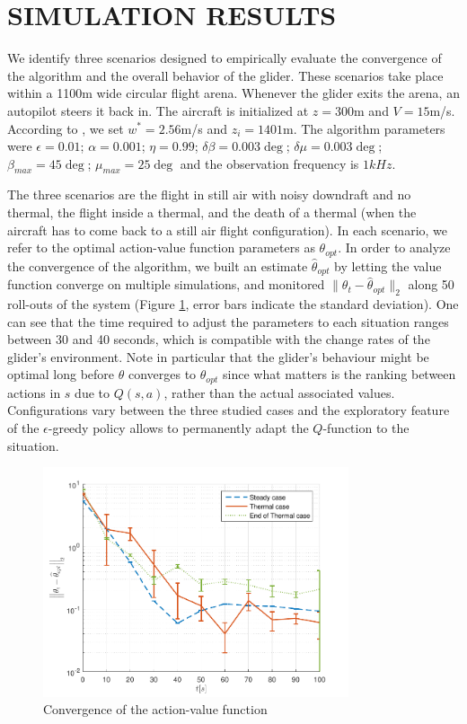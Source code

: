 \documentclass[a4paper, 10pt, conference]{ieeeconf}
\begin{document}
\section{SIMULATION RESULTS}
\label{sec:results}

We identify three scenarios designed to empirically evaluate the convergence of the algorithm and the overall behavior of the glider. These scenarios take place within a 1100m wide circular flight arena. Whenever the glider exits the arena, an autopilot steers it back in. The aircraft is initialized at $z=300$m and $V=15$m/s. According to \cite{allen_thermal}, we set $w^*=2.56$m/s and $z_i=1401$m. The algorithm parameters were $\epsilon = 0.01$; $\alpha = 0.001$; $\eta = 0.99$; $\delta \beta = 0.003\deg$; $\delta \mu = 0.003\deg$; $\beta_{max} = 45\deg$; $\mu_{max} = 25\deg$ and the observation frequency is $1kHz$. 

The three scenarios are the flight in still air with noisy downdraft and no thermal, the flight inside a thermal, and the death of a thermal (when the aircraft has to come back to a still air flight configuration).
In each scenario, we refer to the optimal action-value function parameters as $\theta_{opt}$.
In order to analyze the convergence of the algorithm, we built an estimate $\widehat{\theta}_{opt}$ by letting the value function converge on multiple simulations, and monitored $\|\theta_t - \widehat{\theta}_{opt}\|_2$ along 50 roll-outs of the system (Figure \ref{fig:param_cv}, error bars indicate the standard deviation). One can see that the time required to adjust the parameters to each situation ranges between 30 and 40 seconds, which is compatible with the change rates of the glider's environment. Note in particular that the glider's behaviour might be optimal long before $\theta$ converges to $\theta_{opt}$ since what matters is the ranking between actions in $s$ due to $Q(s,a)$, rather than the actual associated values. Configurations vary between the three studied cases and the exploratory feature of the $\epsilon$-greedy policy allows to permanently adapt the $Q$-function to the situation.

\begin{figure}
\begin{center}
 \includegraphics[width=9cm]{img/cv_speed.pdf}
\end{center}
\caption{Convergence of the action-value function}
\label{fig:param_cv}
\end{figure}
\end{document}
